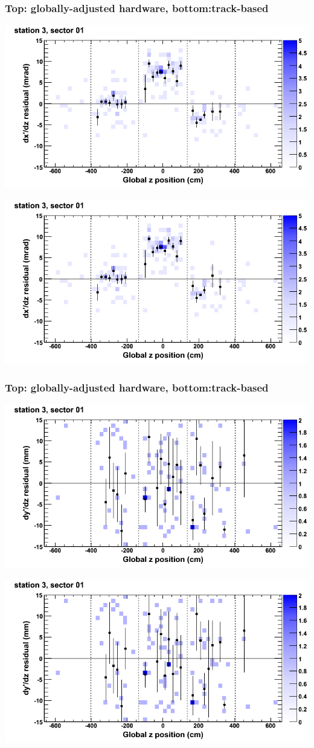 \documentclass[compress]{beamer}
\begin{document}
\begin{frame}
\frametitle{Top: globally-adjusted hardware, bottom:track-based}
\includegraphics[width=0.7\linewidth]{NOV4_mapplots_HW/DTvsz_st3sec01_dxdz.png}

\includegraphics[width=0.7\linewidth]{NOV4_mapplots/DTvsz_st3sec01_dxdz.png}
\end{frame}

\begin{frame}
\frametitle{Top: globally-adjusted hardware, bottom:track-based}
\includegraphics[width=0.7\linewidth]{NOV4_mapplots_HW/DTvsz_st3sec01_dydz.png}

\includegraphics[width=0.7\linewidth]{NOV4_mapplots/DTvsz_st3sec01_dydz.png}
\end{frame}
\end{document}
